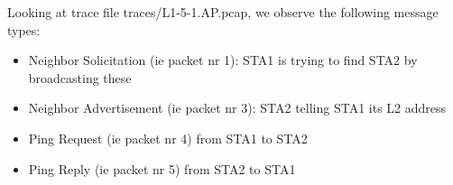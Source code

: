 Looking at trace file traces/L1-5-1.AP.pcap, we observe the following message types:
\begin{itemize}
\item Neighbor Solicitation (ie packet nr 1):  STA1 is trying to find STA2 by broadcasting these
\item Neighbor Advertisement (ie packet nr 3): STA2 telling STA1 its L2 address
\item Ping Request (ie packet nr 4) from STA1 to STA2
\item Ping Reply (ie packet nr 5) from STA2 to STA1
\end{itemize}
